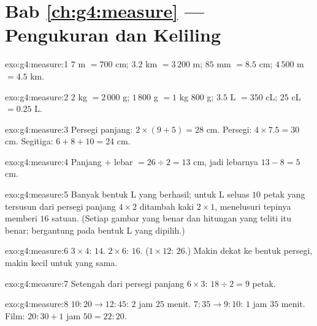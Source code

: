 \section*{Bab \ref{ch:g4:measure} --- Pengukuran dan Keliling}

\begin{solution}{exo:g4:measure:1}
$7$ m $= 700$ cm; \quad $3.2$ km $= 3\,200$ m; \quad
$85$ mm $= 8.5$ cm; \quad $4\,500$ m $= 4.5$ km.
\end{solution}

\begin{solution}{exo:g4:measure:2}
$2$ kg $= 2\,000$ g; \quad $1\,800$ g $= 1$ kg $800$ g; \quad
$3.5$ L $= 350$ cL; \quad $25$ cL $= 0.25$ L.
\end{solution}

\begin{solution}{exo:g4:measure:3}
Persegi panjang: $2 \times (9 + 5) = 28$ cm. Persegi:
$4 \times 7.5 = 30$ cm. Segitiga: $6 + 8 + 10 = 24$ cm.
\end{solution}

\begin{solution}{exo:g4:measure:4}
Panjang $+$ lebar $= 26 \div 2 = 13$ cm, jadi lebarnya
$13 - 8 = 5$ cm.
\end{solution}

\begin{solution}{exo:g4:measure:5}
Banyak bentuk L yang berhasil; untuk L seluas $10$ petak yang
tersusun dari persegi panjang $4 \times 2$ ditambah kaki
$2 \times 1$, menelusuri tepinya memberi $16$ satuan. (Setiap gambar
yang benar dan hitungan yang teliti itu benar;  bergantung pada bentuk L yang dipilih.)
\end{solution}

\begin{solution}{exo:g4:measure:6}
$3 \times 4$:  $14$. $2 \times 6$:  $16$.
($1 \times 12$:  $26$.) Makin dekat ke bentuk persegi, makin
kecil  untuk  yang sama.
\end{solution}

\begin{solution}{exo:g4:measure:7}
Setengah dari persegi panjang $6 \times 3$: $18 \div 2 = 9$ petak.
\end{solution}

\begin{solution}{exo:g4:measure:8}
$10{:}20 \to 12{:}45$: $2$ jam $25$ menit. $7{:}35 \to 9{:}10$:
$1$ jam $35$ menit. Film: $20{:}30 + 1$ jam $50 = 22{:}20$.
\end{solution}

